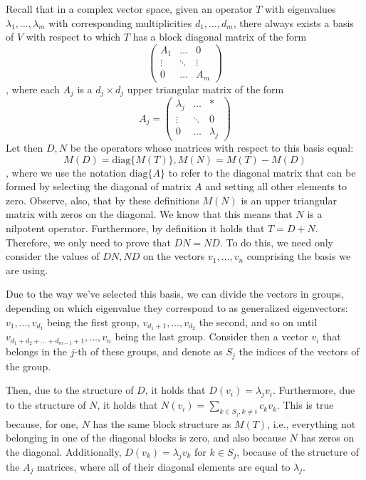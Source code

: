 \begin{solution}

    Recall that in a complex vector space, given an operator $T$ with eigenvalues $\lambda_1, \ldots, \lambda_m$ with corresponding multiplicities $d_1, \ldots, d_m$, there always exists a basis of $V$ with respect to which $T$ has a block diagonal matrix of the form
    $$\begin{pmatrix} A_1 & \ldots & 0 \\ \vdots & \ddots & \vdots \\ 0 & \ldots & A_m
    \end{pmatrix}$$
    , where each $A_j$ is a $d_j \times d_j$ upper triangular matrix of the form
    $$A_j = \begin{pmatrix} \lambda_j & \ldots & * \\ \vdots & \ddots & 0 \\ 0 & \ldots & \lambda_j
    \end{pmatrix}$$
    Let then $D, N$ be the operators whose matrices with respect to this basis equal:
    $$M(D) = \text{diag}\{M(T)\}, M(N) = M(T) - M(D)$$
    , where we use the notation $\text{diag}\{A\}$ to refer to the diagonal matrix that can be formed by selecting the diagonal of matrix $A$ and setting all other elements to zero. Observe, also, that by these definitions $M(N)$ is an upper triangular matrix with zeros on the diagonal. We know that this means that $N$ is a nilpotent operator. Furthermore, by definition it holds that $T = D + N$. Therefore, we only need to prove that $DN = ND$. To do this, we need only consider the values of $DN, ND$ on the vectors $v_1, \ldots, v_n$ comprising the basis we are using. 
    
    Due to the way we've selected this basis, we can divide the vectors in groups, depending on which eigenvalue they correspond to as generalized eigenvectors: $v_1, \ldots, v_{d_1}$ being the first group, $v_{d_1+1}, \ldots, v_{d_2}$ the second, and so on until $v_{d_1 + d_2 + \ldots + d_{m-1}+1}, \ldots, v_{n}$ being the last group. Consider then a vector $v_i$ that belongs in the $j$-th of these groups, and denote as $S_j$ the indices of the vectors of the group. 
    
    Then, due to the structure of $D$, it holds that $D(v_i) = \lambda_j v_i$. Furthermore, due to the structure of $N$, it holds that $N(v_i) = \sum_{k \in S_j, k \neq i}c_k v_k$. This is true because, for one, $N$ has the same block structure as $M(T)$, i.e., everything not belonging in one of the diagonal blocks is zero, and also because $N$ has zeros on the diagonal. Additionally, $D(v_k) = \lambda_j v_k$ for $k \in S_j$, because of the structure of the $A_j$ matrices, where all of their diagonal elements are equal to $\lambda_j$.


\end{solution}
